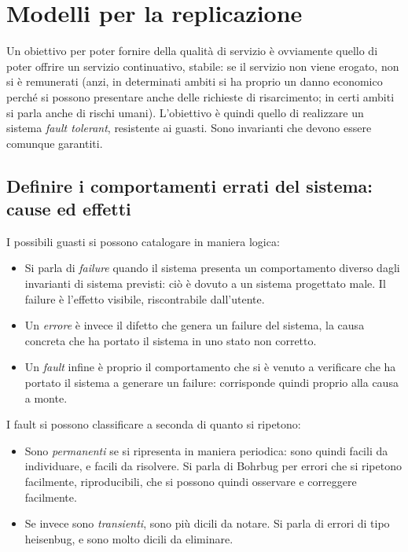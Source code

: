 \chapter{Modelli per la replicazione}
Un obiettivo per poter fornire della qualità di servizio è ovviamente quello di
poter offrire un servizio continuativo,
stabile: se il servizio non viene erogato, non si è remunerati (anzi, in
determinati ambiti si ha proprio un danno economico perché si possono
presentare anche delle richieste di risarcimento; in certi ambiti si parla anche
di rischi umani).
L'obiettivo è quindi quello di realizzare un sistema \textit{fault tolerant},
resistente ai guasti. Sono invarianti che devono essere comunque garantiti.
\section{Definire i comportamenti errati del sistema: cause ed effetti}
I possibili guasti si possono catalogare in maniera logica:
\begin{itemize}
 \item Si parla di \textit{failure} quando il sistema presenta un comportamento
diverso dagli invarianti di sistema
previsti: ciò è dovuto a un sistema progettato male. Il failure è l'effetto
visibile, riscontrabile dall'utente.
 \item Un \textit{errore} è invece il difetto che genera un failure del sistema,
 la causa concreta che ha portato il sistema in uno stato non corretto.
 \item Un \textit{fault} infine è proprio il comportamento che si è venuto a
verificare che ha portato il sistema a generare un
 failure: corrisponde quindi proprio alla causa a monte.
\end{itemize}
I fault si possono classificare a seconda di quanto si ripetono:
\begin{itemize}
 \item Sono \textit{permanenti} se si ripresenta in maniera periodica: sono
quindi facili da individuare, e facili da
 risolvere. Si parla di Bohrbug per errori che si ripetono facilmente,
riproducibili, che si possono quindi osservare
 e correggere facilmente.
 \item Se invece sono \textit{transienti}, sono più dicili da notare. Si parla
di errori di tipo heisenbug, e sono molto
 dicili da eliminare.
\end{itemize}

